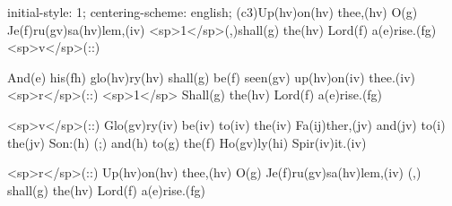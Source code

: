 initial-style: 1;
centering-scheme: english;
(c3)Up(hv)on(hv) thee,(hv) O(g) Je(f)ru(gv)sa(hv)lem,(iv) <sp>1</sp>(,)shall(g) the(hv) Lord(f) a(e)rise.(fg) <sp>v</sp>(::)

And(e) his(fh) glo(hv)ry(hv) shall(g) be(f) seen(gv) up(hv)on(iv) thee.(iv) <sp>r</sp>(::) <sp>1</sp> Shall(g) the(hv) Lord(f) a(e)rise.(fg)

<sp>v</sp>(::) Glo(gv)ry(iv) be(iv) to(iv) the(iv) Fa(ij)ther,(jv) and(jv) to(i) the(jv) Son:(h) (;) and(h) to(g) the(f) Ho(gv)ly(hi) Spir(iv)it.(iv)

<sp>r</sp>(::) Up(hv)on(hv) thee,(hv) O(g) Je(f)ru(gv)sa(hv)lem,(iv) (,) shall(g) the(hv) Lord(f) a(e)rise.(fg)